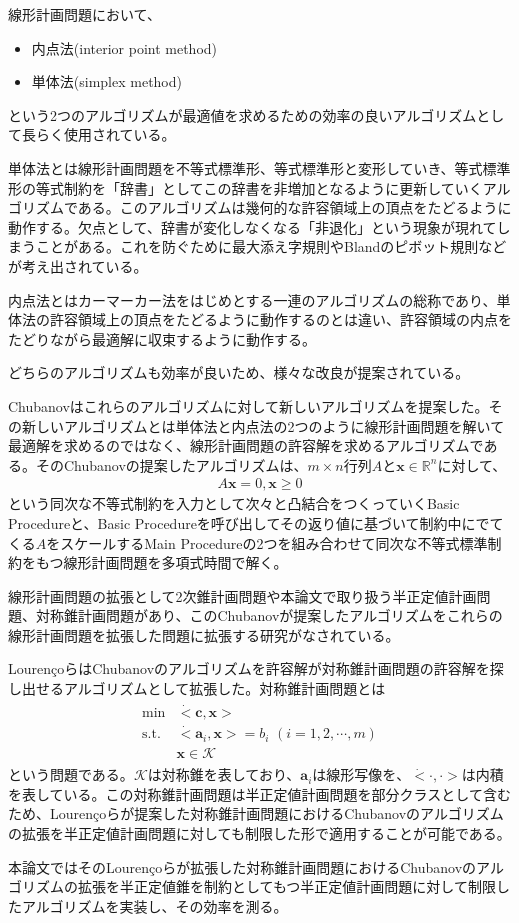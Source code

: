 線形計画問題において、
\begin{itemize}
  \item 内点法(interior point method)
  \item 単体法(simplex method)
\end{itemize}
という2つのアルゴリズムが最適値を求めるための効率の良いアルゴリズムとして長らく使用されている。

単体法とは線形計画問題を不等式標準形、等式標準形と変形していき、等式標準形の等式制約を「辞書」としてこの辞書を非増加となるように更新していくアルゴリズムである。このアルゴリズムは幾何的な許容領域上の頂点をたどるように動作する。欠点として、辞書が変化しなくなる「非退化」という現象が現れてしまうことがある。これを防ぐために最大添え字規則やBlandのピボット規則などが考え出されている\cite*{Optimization}。

内点法とはカーマーカー法をはじめとする一連のアルゴリズムの総称であり、単体法の許容領域上の頂点をたどるように動作するのとは違い、許容領域の内点をたどりながら最適解に収束するように動作する。

どちらのアルゴリズムも効率が良いため、様々な改良が提案されている\cite*{InteriorPointMethod}。

Chubanovはこれらのアルゴリズムに対して新しいアルゴリズムを提案した\cite*{Chubanov}。その新しいアルゴリズムとは単体法と内点法の2つのように線形計画問題を解いて最適解を求めるのではなく、線形計画問題の許容解を求めるアルゴリズムである。そのChubanovの提案したアルゴリズムは、$m \times n$行列$A$と$\mathbf{x} \in \mathbb{R}^n$に対して、
\begin{align*}
  A \mathbf{x} = 0, \mathbf{x} \geq 0
\end{align*}
という同次な不等式制約を入力として次々と凸結合をつくっていくBasic Procedureと、Basic Procedureを呼び出してその返り値に基づいて制約中にでてくる$A$をスケールするMain Procedureの2つを組み合わせて同次な不等式標準制約をもつ線形計画問題を多項式時間で解く。

線形計画問題の拡張として2次錐計画問題や本論文で取り扱う半正定値計画問題、対称錐計画問題があり、このChubanovが提案したアルゴリズムをこれらの線形計画問題を拡張した問題に拡張する研究がなされている\cite*{SOCP}\cite*{SymmetricCone}。

Louren\c{c}oらはChubanovのアルゴリズムを許容解が対称錐計画問題の許容解を探し出せるアルゴリズムとして拡張した\cite*{SymmetricCone}。対称錐計画問題とは
\begin{align*}
  \begin{array}{ll}
    \text{min}  & \dot<\mathbf{c}, \mathbf{x}> \\
    \text{s.t.} & \dot<\mathbf{a}_i, \mathbf{x}> = b_i \,\, (i = 1, 2, \cdots, m) \\
                & \mathbf{x} \in \mathcal{K}
  \end{array}
\end{align*}
という問題である。$\mathcal{K}$は対称錐を表しており、$\mathbf{a}_i$は線形写像を、$\dot<\cdot, \cdot>$は内積を表している。この対称錐計画問題は半正定値計画問題を部分クラスとして含むため、Louren\c{c}oらが提案した対称錐計画問題におけるChubanovのアルゴリズムの拡張を半正定値計画問題に対しても制限した形で適用することが可能である。

本論文ではそのLouren\c{c}oらが拡張した対称錐計画問題におけるChubanovのアルゴリズムの拡張を半正定値錐を制約としてもつ半正定値計画問題に対して制限したアルゴリズムを実装し、その効率を測る。

